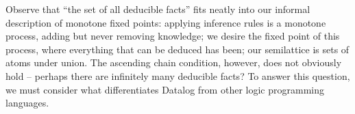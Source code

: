 
Observe that ``the set of all deducible facts'' fits neatly into our informal
description of monotone fixed points: applying inference rules is a monotone
process, adding but never removing knowledge; we desire the fixed point of this
process, where everything that can be deduced has been; our semilattice is sets
of atoms under union. The ascending chain condition, however, does not obviously
hold -- perhaps there are infinitely many deducible facts? To answer this
question, we must consider what differentiates Datalog from other logic
programming languages.









